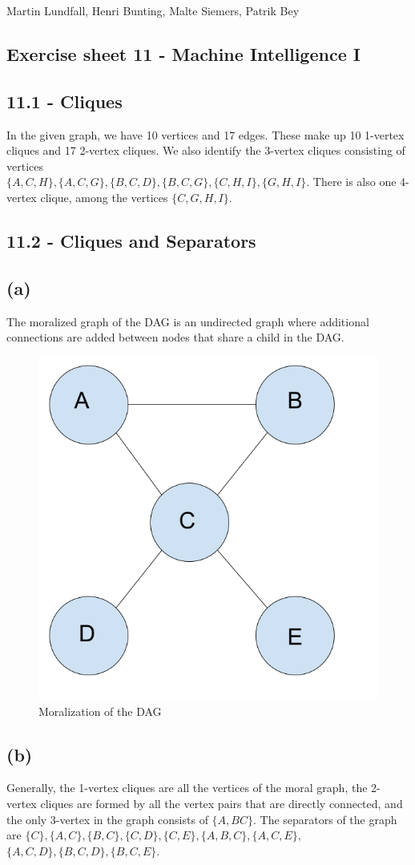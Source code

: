 \documentclass[11pt,a4paper]{article}
\begin{document}
\noindent
Martin Lundfall, Henri Bunting, Malte Siemers, Patrik Bey
\begin{centering}
  \section*{Exercise sheet 11 - Machine Intelligence I}
  \end{centering}
\subsection*{11.1 - Cliques}
In the given graph, we have 10 vertices and 17 edges. These make up 10 1-vertex cliques and 17 2-vertex cliques. We also identify the 3-vertex cliques consisting of vertices\\ $\{A,C,H\},\{A, C, G\},\{B, C, D\}, \{B, C, G\}, \{C, H, I\}, \{G, H, I\}$. There is also one 4-vertex clique, among the vertices $\{C, G, H, I\}$.
\subsection*{11.2 - Cliques and Separators}
\subsection*{(a)}
The moralized graph of the DAG is an undirected graph where additional connections are added between nodes that share a child in the DAG.
\begin{figure}[h]
  \caption{Moralization of the DAG}
  \centering
  \includegraphics[width=.7\textwidth]{moral}
\end{figure}
\subsection*{(b)}
Generally, the 1-vertex cliques are all the vertices of the moral graph, the 2-vertex cliques are formed by all the vertex pairs that are directly connected, and the only 3-vertex in the graph consists of $\{A, B C\}$. The separators of the graph are $\{C\}, \{A, C\}, \{B, C\}, \{C, D\}, \{C, E\}, \{A, B, C\}, \{A, C, E\},$\\$ \{A, C, D\}, \{B, C, D\}, \{B, C, E\}$.
\end{document}
